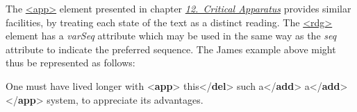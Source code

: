 The \hyperref[TEI.app]{<app>} element presented in chapter \textit{\hyperref[TC]{12.\ Critical Apparatus}} provides similar facilities, by treating each state of the text as a distinct reading. The \hyperref[TEI.rdg]{<rdg>} element has a {\itshape varSeq} attribute which may be used in the same way as the {\itshape seq} attribute to indicate the preferred sequence. The James example above might thus be represented as follows: \par\bgroup{}\exampleFont \begin{shaded}\noindent\mbox{}One must have lived longer with {<\textbf{app}>}\mbox{}\newline 
{}\mbox{}\newline 
\hspace*{1em}this{</\textbf{del}>}\mbox{}\newline 
{}\mbox{}\newline 
{}\mbox{}\newline 
\hspace*{1em}\mbox{}\newline 
\hspace*{1em}\hspace*{1em}such a{</\textbf{add}>}\mbox{}\newline 
\hspace*{1em}\mbox{}\newline 
{}\mbox{}\newline 
{}\mbox{}\newline 
\hspace*{1em}a{</\textbf{add}>}\mbox{}\newline 
{}\mbox{}\newline 
{</\textbf{app}>} system, to appreciate its advantages.\end{shaded}\egroup\par 
